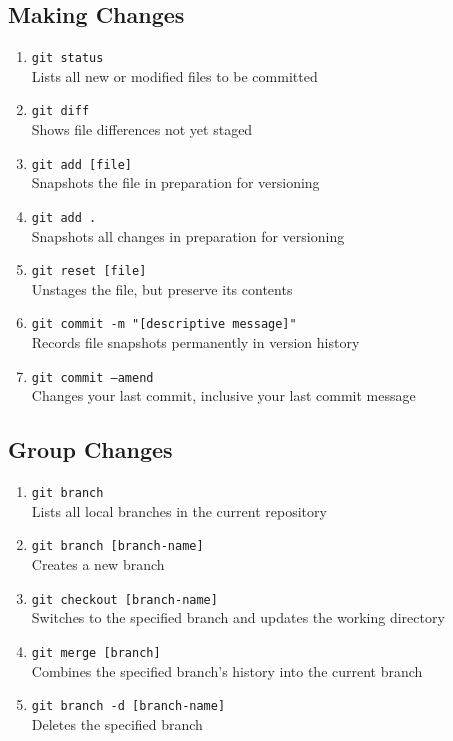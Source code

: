 \documentclass[a4paper, twoside, 8pt]{extarticle}
\newenvironment{enumx} {
	\begin{enumerate}[leftmargin=*]
	\setlength{\topsep}{0pt}
	\setlength{\itemsep}{0pt}
	\setlength{\parskip}{0pt}
	\setlength{\parsep}{0pt}
	}
{\end{enumerate}}
\begin{document}
\begin{multicols}{3}
\subsection{Making Changes}
\begin{enumx}
    \item \texttt{git status}\\
    Lists all new or modified files to be committed
    \item \texttt{git diff}\\
    Shows file differences not yet staged
    \item \texttt{git add [file]}\\
    Snapshots the file in preparation for versioning
    \item \texttt{git add .}\\
    Snapshots all changes in preparation for versioning
    \item \texttt{git reset [file]}\\
    Unstages the file, but preserve its contents
    \item \texttt{git commit -m "[descriptive message]"}\\
    Records file snapshots permanently in version history
    \item \texttt{git commit --amend}\\
    Changes your last commit, inclusive your last commit message
\end{enumx}

\subsection{Group Changes}
\begin{enumx}
    \item \texttt{git branch}\\
    Lists all local branches in the current repository
    \item \texttt{git branch [branch-name]}\\
    Creates a new branch
    \item \texttt{git checkout [branch-name]}\\
    Switches to the specified branch and updates the working directory
    \item \texttt{git merge [branch]}\\
    Combines the specified branch’s history into the current branch
    \item \texttt{git branch -d [branch-name]}\\
    Deletes the specified branch
\end{enumx}


\end{multicols}
\end{document}
